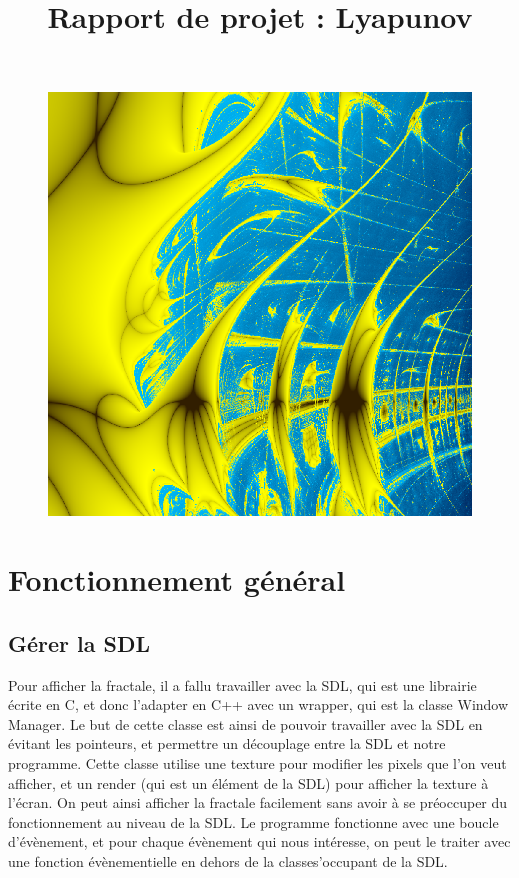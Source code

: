 \documentclass{article}
\title{Rapport de projet : Lyapunov}
\date{}
\begin{document}
	\vspace*{-2pt}
	{\let\newpage\relax\maketitle} \thispagestyle{fancy}
	\vspace{-2cm}
	\begin{figure}[!h]
	\centering
	\includegraphics[scale=0.3]{zircon}
	\end{figure}
	\section{Fonctionnement général}
	\subsection{Gérer la SDL}
	Pour afficher la fractale, il a fallu travailler avec la SDL, qui est une librairie écrite en C, et donc l'adapter en C++ avec un wrapper, qui est la classe Window Manager.
	Le but de cette classe est ainsi de pouvoir travailler avec la SDL en évitant les pointeurs, et permettre un découplage entre la SDL et notre programme.
	Cette classe utilise une texture pour modifier les pixels que l'on veut afficher, et un render (qui est un élément de la SDL) pour afficher la texture à l'écran.
	On peut ainsi afficher la fractale facilement sans avoir à se préoccuper du fonctionnement au niveau de la SDL.
	Le programme fonctionne avec une boucle d'évènement, et pour chaque évènement qui nous intéresse, on peut le traiter avec une fonction évènementielle en dehors de la classes'occupant de la SDL.
\end{document}
